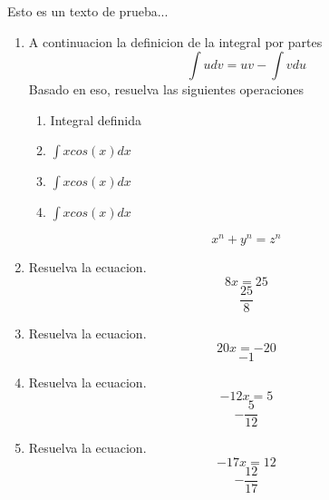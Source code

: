 \documentclass[12pt]{article}%
\begin{document}
%
\normalsize%
\pagestyle{header}%
Esto es un texto de prueba...%
\begin{enumerate}[wide, labelwidth=!, labelindent=0pt,label={Pregunta \arabic*. }]%
\item%
%
A continuacion la definicion de la integral por partes%
\[\int udv=uv-\int vdu\]%
Basado en eso, resuelva las siguientes operaciones%
\begin{enumerate}[wide, labelwidth=!, labelindent=0pt,label={\Alph*) }]%
\item%
%
Integral definida\\%
\item%
%
\(\int xcos(x)dx\)%
\item%
%
\(\int xcos(x)dx\)%
\item%
%
\(\int xcos(x)dx\)%
\end{enumerate}%
\[ x^n + y^n = z^n \]%
\item%
%
Resuelva la ecuacion.%
\begin{equation*}8 x = 25\end{equation*}%
\begin{equation*}\frac{25}{8}\end{equation*}%
\item%
%
Resuelva la ecuacion.%
\begin{equation*}20 x = -20\end{equation*}%
\begin{equation*}-1\end{equation*}%
\item%
%
Resuelva la ecuacion.%
\begin{equation*}- 12 x = 5\end{equation*}%
\begin{equation*}- \frac{5}{12}\end{equation*}%
\item%
%
Resuelva la ecuacion.%
\begin{equation*}- 17 x = 12\end{equation*}%
\begin{equation*}- \frac{12}{17}\end{equation*}%
\end{enumerate}%
\end{document}
